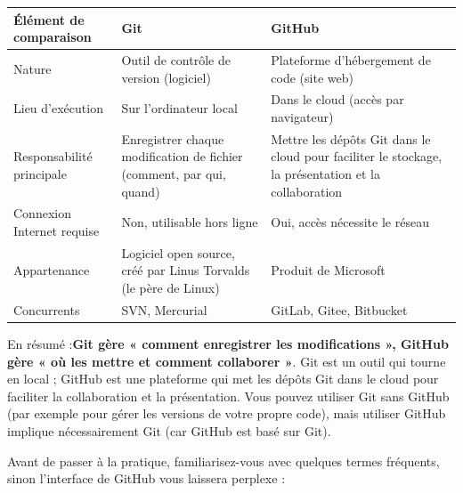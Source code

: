 \begin{center}
\begin{tabularx}{\linewidth}{|X|X|X|}
\hline
\textbf{Élément de comparaison} & \textbf{Git} & \textbf{GitHub} \tabularnewline
\hline
Nature & Outil de contrôle de version (logiciel) & Plateforme d'hébergement de code (site web) \tabularnewline
Lieu d'exécution & Sur l'ordinateur local & Dans le cloud (accès par navigateur) \tabularnewline
Responsabilité principale & Enregistrer chaque modification de fichier (comment, par qui, quand) & Mettre les dépôts Git dans le cloud pour faciliter le stockage, la présentation et la collaboration \tabularnewline
Connexion Internet requise & Non, utilisable hors ligne & Oui, accès nécessite le réseau \tabularnewline
Appartenance & Logiciel open source, créé par Linus Torvalds (le père de Linux) & Produit de Microsoft \tabularnewline
Concurrents & SVN, Mercurial & GitLab, Gitee, Bitbucket \tabularnewline
\hline
\end{tabularx}
\end{center}

En résumé :\textbf{Git gère « comment enregistrer les modifications », GitHub gère « où les mettre et comment collaborer »}. Git est un outil qui tourne en local ; GitHub est une plateforme qui met les dépôts Git dans le cloud pour faciliter la collaboration et la présentation. Vous pouvez utiliser Git sans GitHub (par exemple pour gérer les versions de votre propre code), mais utiliser GitHub implique nécessairement Git (car GitHub est basé sur Git).



Avant de passer à la pratique, familiarisez-vous avec quelques termes fréquents, sinon l'interface de GitHub vous laissera perplexe :

